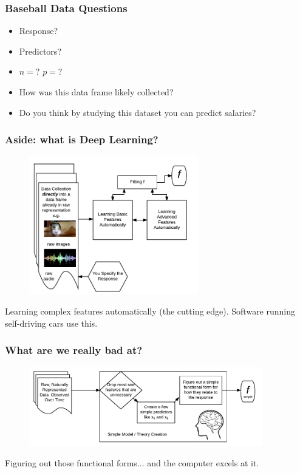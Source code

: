 \documentclass[slides]{beamer} %
\begin{document}
\begin{frame}\frametitle{Baseball Data Questions}

\begin{itemize}
\item Response?
\item Predictors?
\item $n = $? $p = $?
\item How was this data frame likely collected?
\item Do you think by studying this dataset you can predict salaries?
\end{itemize}

	
\end{frame}


\begin{frame}\frametitle{Aside: what is Deep Learning?}
\begin{figure}
\centering
\includegraphics[width=2.9in]{deep_learning}
\end{figure}

Learning complex features automatically (the cutting edge). Software running self-driving cars use this.
\end{frame}


\begin{frame}\frametitle{What are we really bad at?}

\begin{figure}
\centering
\includegraphics[width=4in]{human_simple_model_learning}
\end{figure}

Figuring out those functional forms... and the computer excels at it.

\end{frame}
\end{document}
